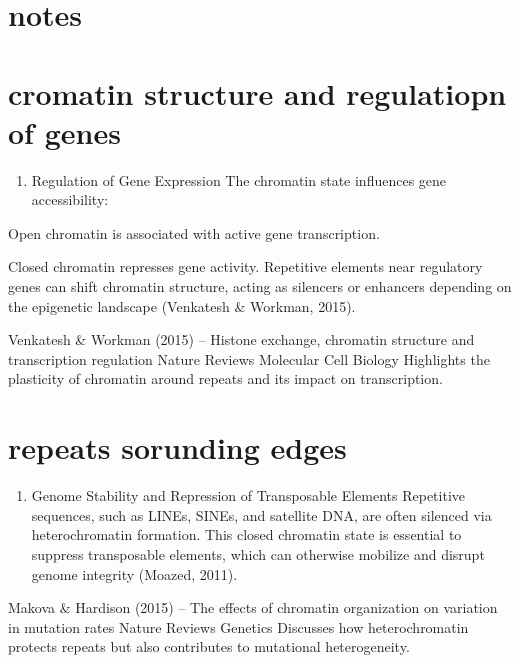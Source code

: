 \documentclass[
  a4paper,
  openany]{scrbook}
\providecommand{\tightlist}{%
  \setlength{\itemsep}{0pt}\setlength{\parskip}{0pt}}
\begin{document}
\chapter{notes}\label{notes}

\chapter{cromatin structure and regulatiopn of
genes}\label{cromatin-structure-and-regulatiopn-of-genes}

\begin{enumerate}
\def\labelenumi{\arabic{enumi}.}
\setcounter{enumi}{1}
\tightlist
\item
  Regulation of Gene Expression The chromatin state influences gene
  accessibility:
\end{enumerate}

Open chromatin is associated with active gene transcription.

Closed chromatin represses gene activity. Repetitive elements near
regulatory genes can shift chromatin structure, acting as silencers or
enhancers depending on the epigenetic landscape (Venkatesh \& Workman,
2015).

Venkatesh \& Workman (2015) -- Histone exchange, chromatin structure and
transcription regulation Nature Reviews Molecular Cell Biology
Highlights the plasticity of chromatin around repeats and its impact on
transcription.

\chapter{repeats sorunding edges}\label{repeats-sorunding-edges}

\begin{enumerate}
\def\labelenumi{\arabic{enumi}.}
\tightlist
\item
  Genome Stability and Repression of Transposable Elements Repetitive
  sequences, such as LINEs, SINEs, and satellite DNA, are often silenced
  via heterochromatin formation. This closed chromatin state is
  essential to suppress transposable elements, which can otherwise
  mobilize and disrupt genome integrity (Moazed, 2011).
\end{enumerate}

Makova \& Hardison (2015) -- The effects of chromatin organization on
variation in mutation rates Nature Reviews Genetics Discusses how
heterochromatin protects repeats but also contributes to mutational
heterogeneity.
\end{document}
